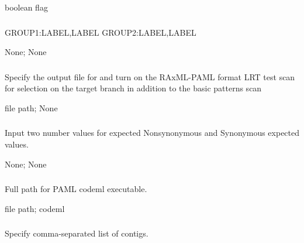 \documentclass[letterpaper,11pt,english]{sphinxmanual}
\begin{document}
 boolean flag


\subsubsection{}
\label{\detokenize{prog_desc:allele-groups-allelegroups}}
 GROUP1:LABEL,LABEL GROUP2:LABEL,LABEL

 None;  None


\subsubsection{}
\label{\detokenize{prog_desc:branch-lrt-branchlrt}}
 Specify the output file for and turn on the RAxML-PAML format LRT test scan for selection on the target branch in addition to the basic patterns scan

 file path;  None


\subsubsection{}
\label{\detokenize{prog_desc:chi-test-chitest}}
 Input two number values for expected Nonsynonymous and Synonymous expected values.

 None;  None


\subsubsection{}
\label{\detokenize{prog_desc:codeml-path-codemlpath}}
 Full path for PAML codeml executable.

 file path;  codeml


\subsubsection{}
\label{\detokenize{prog_desc:id100}}
 Specify comma-separated list of contigs.
\end{document}
